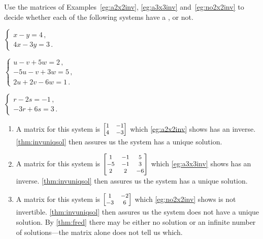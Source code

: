 \begin{example} \label{eg:}
Use the matrices of Examples~\ref{eg:a2x2inv}, \ref{eg:a3x3inv} and~\ref{eg:no2x2inv} to decide whether each of the following systems have a , or not.
\begin{parts}
\item \(\begin{cases}
x-y=4\,,\\4x-3y=3\,.
\end{cases}\)
\item \(\begin{cases}
u-v+5w=2\,,\\ -5u-v+3w=5\,,\\ 2u+2v-6w=1\,.
\end{cases}\)
\item \(\begin{cases}
r-2s=-1\,,\\-3r+6s=3\,.
\end{cases}\)
\end{parts}
\begin{solution} 
\begin{enumerate}
\item A matrix for this system is \(\footnotesize\begin{bmatrix} 1&-1\\4&-3 \end{bmatrix}\) which \autoref{eg:a2x2inv} shows has an inverse.  
\autoref{thm:invuniqsol} then assures us the system has a unique solution.
\item A matrix for this system is \(\footnotesize\begin{bmatrix} 1&-1&5\\-5&-1&3\\2&2&-6 \end{bmatrix}\) which \autoref{eg:a3x3inv} shows has an inverse.  
\autoref{thm:invuniqsol} then assures us the system has a unique solution.
\item A matrix for this system is \(\footnotesize\begin{bmatrix} 1&-2\\-3&6 \end{bmatrix}\) which \autoref{eg:no2x2inv} shows is not invertible.  
\autoref{thm:invuniqsol} then assures us the system does not have a unique solution.
By \autoref{thm:fred} there may be either no solution or an infinite number of solutions---the matrix alone does not tell us which.
\end{enumerate}
\end{solution}
\end{example}






